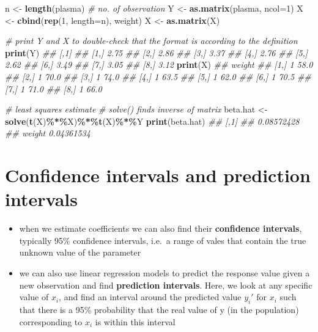 \documentclass[
]{book}
\newenvironment{Shaded}{\begin{snugshade}}{\end{snugshade}}
\newcommand{\CommentTok}[1]{\textcolor[rgb]{0.56,0.35,0.01}{\textit{#1}}}
\newcommand{\DataTypeTok}[1]{\textcolor[rgb]{0.13,0.29,0.53}{#1}}
\newcommand{\DecValTok}[1]{\textcolor[rgb]{0.00,0.00,0.81}{#1}}
\newcommand{\KeywordTok}[1]{\textcolor[rgb]{0.13,0.29,0.53}{\textbf{#1}}}
\newcommand{\NormalTok}[1]{#1}
\newcommand{\OperatorTok}[1]{\textcolor[rgb]{0.81,0.36,0.00}{\textbf{#1}}}
\newcommand{\StringTok}[1]{\textcolor[rgb]{0.31,0.60,0.02}{#1}}
\providecommand{\tightlist}{%
  \setlength{\itemsep}{0pt}\setlength{\parskip}{0pt}}
\theoremstyle{definition}
\theoremstyle{definition}
\theoremstyle{definition}
\theoremstyle{remark}
\begin{document}
\begin{Shaded}
\begin{Highlighting}[]
\NormalTok{n \textless{}{-}}\StringTok{ }\KeywordTok{length}\NormalTok{(plasma) }\CommentTok{\# no. of observation}
\NormalTok{Y \textless{}{-}}\StringTok{ }\KeywordTok{as.matrix}\NormalTok{(plasma, }\DataTypeTok{ncol=}\DecValTok{1}\NormalTok{)}
\NormalTok{X \textless{}{-}}\StringTok{ }\KeywordTok{cbind}\NormalTok{(}\KeywordTok{rep}\NormalTok{(}\DecValTok{1}\NormalTok{, }\DataTypeTok{length=}\NormalTok{n), weight)}
\NormalTok{X \textless{}{-}}\StringTok{ }\KeywordTok{as.matrix}\NormalTok{(X)}

\CommentTok{\# print Y and X to double{-}check that the format is according to the definition}
\KeywordTok{print}\NormalTok{(Y) }
\CommentTok{\#\#      [,1]}
\CommentTok{\#\# [1,] 2.75}
\CommentTok{\#\# [2,] 2.86}
\CommentTok{\#\# [3,] 3.37}
\CommentTok{\#\# [4,] 2.76}
\CommentTok{\#\# [5,] 2.62}
\CommentTok{\#\# [6,] 3.49}
\CommentTok{\#\# [7,] 3.05}
\CommentTok{\#\# [8,] 3.12}
\KeywordTok{print}\NormalTok{(X) }
\CommentTok{\#\#        weight}
\CommentTok{\#\# [1,] 1   58.0}
\CommentTok{\#\# [2,] 1   70.0}
\CommentTok{\#\# [3,] 1   74.0}
\CommentTok{\#\# [4,] 1   63.5}
\CommentTok{\#\# [5,] 1   62.0}
\CommentTok{\#\# [6,] 1   70.5}
\CommentTok{\#\# [7,] 1   71.0}
\CommentTok{\#\# [8,] 1   66.0}

\CommentTok{\# least squares estimate}
\CommentTok{\# solve() finds inverse of matrix}
\NormalTok{beta.hat \textless{}{-}}\StringTok{ }\KeywordTok{solve}\NormalTok{(}\KeywordTok{t}\NormalTok{(X)}\OperatorTok{\%*\%}\NormalTok{X)}\OperatorTok{\%*\%}\KeywordTok{t}\NormalTok{(X)}\OperatorTok{\%*\%}\NormalTok{Y }
\KeywordTok{print}\NormalTok{(beta.hat)}
\CommentTok{\#\#              [,1]}
\CommentTok{\#\#        0.08572428}
\CommentTok{\#\# weight 0.04361534}
\end{Highlighting}
\end{Shaded}

\hypertarget{confidence-intervals-and-prediction-intervals}{%
\section{Confidence intervals and prediction intervals}\label{confidence-intervals-and-prediction-intervals}}

\begin{itemize}
\tightlist
\item
  when we estimate coefficients we can also find their \textbf{confidence intervals}, typically 95\% confidence intervals, i.e.~a range of vales that contain the true unknown value of the parameter
\item
  we can also use linear regression models to predict the response value given a new observation and find \textbf{prediction intervals}. Here, we look at any specific value of \(x_i\), and find an interval around the predicted value \(y_i'\) for \(x_i\) such that there is a 95\% probability that the real value of y (in the population) corresponding to \(x_i\) is within this interval
\end{itemize}
\end{document}
